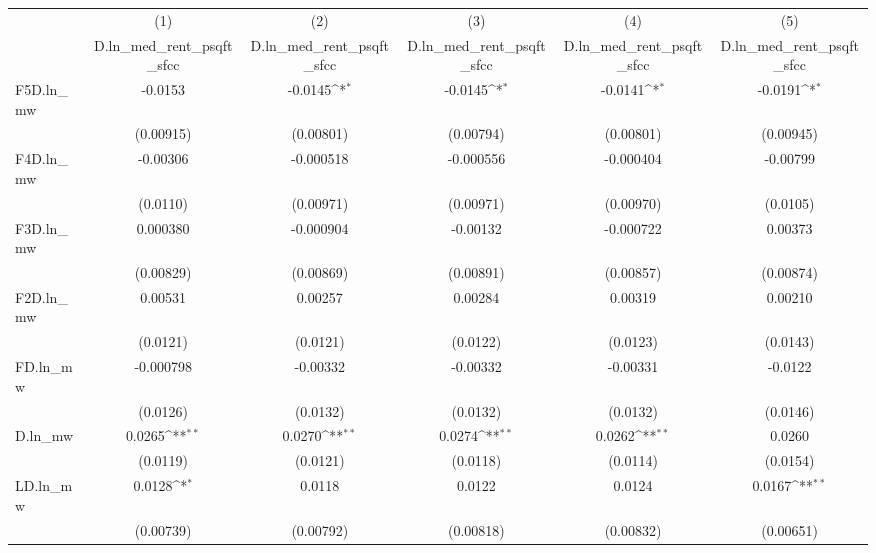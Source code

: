 {
\def\sym#1{\ifmmode^{#1}\else\(^{#1}\)\fi}
\begin{tabular}{l*{5}{c}}
\hline\hline
          &\multicolumn{1}{c}{(1)}&\multicolumn{1}{c}{(2)}&\multicolumn{1}{c}{(3)}&\multicolumn{1}{c}{(4)}&\multicolumn{1}{c}{(5)}\\
          &\multicolumn{1}{c}{D.ln\_med\_rent\_psqft\_sfcc}&\multicolumn{1}{c}{D.ln\_med\_rent\_psqft\_sfcc}&\multicolumn{1}{c}{D.ln\_med\_rent\_psqft\_sfcc}&\multicolumn{1}{c}{D.ln\_med\_rent\_psqft\_sfcc}&\multicolumn{1}{c}{D.ln\_med\_rent\_psqft\_sfcc}\\
\hline
F5D.ln\_mw &  -0.0153         &  -0.0145\sym{*}  &  -0.0145\sym{*}  &  -0.0141\sym{*}  &  -0.0191\sym{*}  \\
          &(0.00915)         &(0.00801)         &(0.00794)         &(0.00801)         &(0.00945)         \\
[1em]
F4D.ln\_mw & -0.00306         &-0.000518         &-0.000556         &-0.000404         & -0.00799         \\
          & (0.0110)         &(0.00971)         &(0.00971)         &(0.00970)         & (0.0105)         \\
[1em]
F3D.ln\_mw & 0.000380         &-0.000904         & -0.00132         &-0.000722         &  0.00373         \\
          &(0.00829)         &(0.00869)         &(0.00891)         &(0.00857)         &(0.00874)         \\
[1em]
F2D.ln\_mw &  0.00531         &  0.00257         &  0.00284         &  0.00319         &  0.00210         \\
          & (0.0121)         & (0.0121)         & (0.0122)         & (0.0123)         & (0.0143)         \\
[1em]
FD.ln\_mw  &-0.000798         & -0.00332         & -0.00332         & -0.00331         &  -0.0122         \\
          & (0.0126)         & (0.0132)         & (0.0132)         & (0.0132)         & (0.0146)         \\
[1em]
D.ln\_mw   &   0.0265\sym{**} &   0.0270\sym{**} &   0.0274\sym{**} &   0.0262\sym{**} &   0.0260         \\
          & (0.0119)         & (0.0121)         & (0.0118)         & (0.0114)         & (0.0154)         \\
[1em]
LD.ln\_mw  &   0.0128\sym{*}  &   0.0118         &   0.0122         &   0.0124         &   0.0167\sym{**} \\
          &(0.00739)         &(0.00792)         &(0.00818)         &(0.00832)         &(0.00651)         \\

\end{tabular}}
